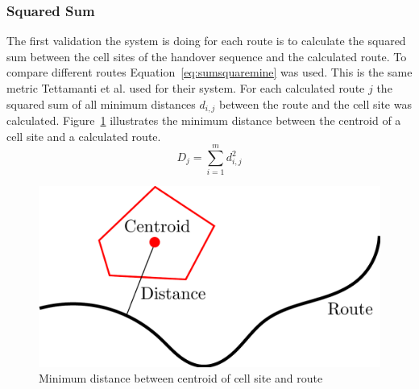\documentclass[master,english]{hgbthesis}
\begin{document}
\subsubsection{Squared Sum}
The first validation the system is doing for each route is to calculate the squared sum between the cell sites of the handover sequence and the calculated route. To compare different routes Equation~\ref{eq:sumsquaremine} was used. This is the same metric Tettamanti et al.\cite{Tettamanti2010} used for their system. For each calculated route $j$ the squared sum of all minimum distances $d_{i,j}$  between the route and the cell site was calculated. Figure~\ref{fig:rms} illustrates the minimum distance between the centroid of a cell site and a calculated route.
\begin{equation}
	\label{eq:sumsquaremine}
	D_j=\sum_{i=1}^{m} d_{i,j}^{2}
\end{equation}
\begin{figure}
	\centering
	\includegraphics[width=0.7\linewidth]{./images/rms}
	\caption{Minimum distance between centroid of cell site and route}
	\label{fig:rms}
\end{figure}
\end{document}

